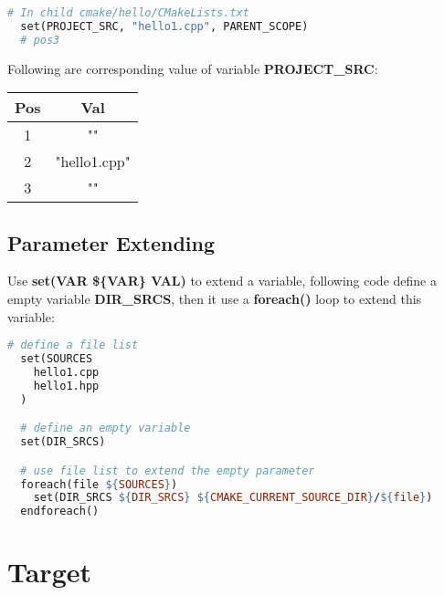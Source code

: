 \documentclass[11pt]{article}
\begin{document}
\begin{lstlisting}[language=make,label=lst:4lst,caption=Parameter passing]
  # In child cmake/hello/CMakeLists.txt
  set(PROJECT_SRC, "hello1.cpp", PARENT_SCOPE)
  # pos3
\end{lstlisting}

Following are corresponding value of variable \textbf{PROJECT\_SRC}:

\begin{center}
  \begin{tabular}{|c|c|}
    \hline
     \textbf{Pos} & \textbf{Val}  \\
    \hline
     1 & ""  \\
    \hline
     2 & "hello1.cpp"  \\
    \hline
     3 & ""  \\
    \hline
  \end{tabular}
\end{center}


\indent
\subsection{Parameter Extending}%
\label{sub:parameter_expand}

Use \textbf{set(VAR \$\{VAR\} VAL)} to extend a variable,  following code define a empty variable \textbf{DIR\_SRCS}, then it use a \textbf{foreach()} loop to extend this variable:

\begin{lstlisting}[language=make,label=lst:4lst,caption=Extend a Parameter]
  # define a file list
  set(SOURCES
    hello1.cpp
    hello1.hpp
  )

  # define an empty variable
  set(DIR_SRCS)

  # use file list to extend the empty parameter
  foreach(file ${SOURCES})
    set(DIR_SRCS ${DIR_SRCS} ${CMAKE_CURRENT_SOURCE_DIR}/${file})
  endforeach()
\end{lstlisting}





\clearpage
\section{Target}%
\label{sec:target}
\end{document}
